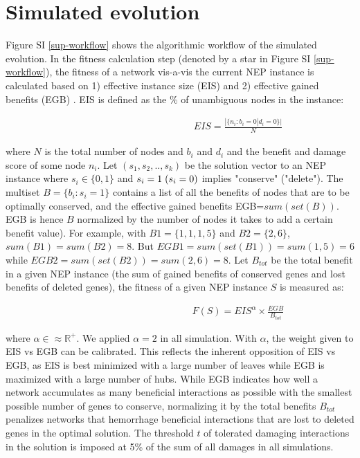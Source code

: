 

\newpage
\section{Simulated evolution}\label{sup_sim_evo}
    Figure SI \ref{sup-workflow} shows the algorithmic workflow of the simulated evolution. In the fitness calculation step (denoted by a star in Figure SI  \ref{sup-workflow}), the fitness of a network vis-a-vis the current NEP instance is calculated based on 1) effective instance size (EIS) and 2) effective gained benefits (EGB) \cite{atiia_computational_2017-1}.
    EIS is defined as the \% of unambiguous nodes in the instance:


        \begin{align}
            \qquad\qquad\qquad\qquad\qquad\qquad EIS=\frac{|\{n_i:b_i=0|d_i=0\}|}{N}
        \end{align}


    \vspace{3mm}\noindent where $N$ is the total number of nodes and $b_i$ and $d_i$ and the benefit and damage score of some node $n_i$. Let $(s_1, s_2, .., s_k)$ be the solution vector to an NEP instance where $s_i\in\{0,1\}$  and $s_i=1 \hspace{0.1cm} (s_i=0)$ implies "conserve" ("delete"). The multiset $B=\{b_i: s_i=1\}$ contains a list of all the benefits of nodes that are to be optimally conserved, and the  effective gained benefits EGB=$sum(set(B))$.  EGB is hence $B$ normalized by the number of nodes it takes  to add a certain benefit value). For example, with
    $B1=\{1,1,1,5\}$
    and
    $B2=\{2,6\}$, $sum(B1)=sum(B2)=8$.
    But
    $EGB1 = sum(set(B1))=sum({1,5})= 6$
    while
    $EGB2 = sum(set(B2))=sum({2,6})=8$.
    Let $B_{tot}$ be the total benefit in a given NEP instance (the sum of gained benefits of conserved genes and lost benefits of deleted genes), the fitness of a given NEP instance $S$ is measured as:

        \begin{align}
            \qquad\qquad\qquad\qquad\qquad\qquad F(S) = EIS^\alpha \times \frac {EGB}{B_{tot}}
        \end{align}



    \vspace{3mm}\noindent where $\alpha\in \approx \mathbb{R}^{+}$. We applied $\alpha=2$ in all simulation. With  $\alpha$, the weight  given to EIS vs EGB can be calibrated. This reflects the inherent opposition of EIS vs EGB, as EIS is best minimized with a large number of leaves while EGB is maximized with a large number of hubs. While EGB indicates how well a network accumulates as many beneficial interactions as possible with the smallest possible number of genes to conserve, normalizing it by the total benefits $B_{tot}$ penalizes networks that hemorrhage beneficial interactions that are lost to deleted genes in the optimal solution. The threshold $t$ of tolerated damaging interactions in the solution is imposed at 5\% of the sum of all damages in all simulations.


